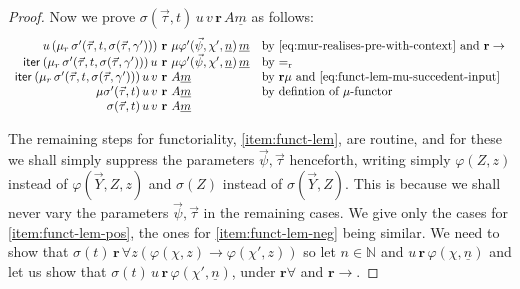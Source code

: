 \documentclass[10pt,a4paper]{amsart}
\theoremstyle{plain}
\theoremstyle{definition}
\renewcommand{\phi}{\varphi}
\theoremstyle{plain}
\theoremstyle{definition} %
\newcommand{\numeral}[1]{\underline{#1}}
\newcommand{\Nat}{\mathbb{N}}
\newcommand{\iter}[1]{\mathsf{iter}_{#1}}
\newcommand{\rr}[1]{#1_r}
\newcommand{\reduction}{\mathrm{r}}
\newcommand{\converts}{=_{\reduction}}
\newcommand{\limp}{\to}
\newcommand{\realises}{\mathbf{r}}
\begin{document}
\begin{proof}
    Now we prove $\sigma(\vec \tau,t)\, u\, v\, \realises\, A\numeral m$ as follows:
    \[
    \begin{array}{r@{\ \realises \ }ll}
          u\, (\rr\mu\, \sigma'(\vec \tau,t,\sigma(\vec \tau,\gamma'))) & \mu\phi'(\vec \psi,\chi',\numeral n)\, \numeral m & \text{by \eqref{eq:mur-realises-pre-with-context} and $\realises\limp$}\\
          \iter{}\, (\rr\mu\, \sigma'(\vec \tau,t,\sigma(\vec \tau,\gamma')))\, u & \mu\phi'(\vec \psi,\chi',\numeral n)\, \numeral m & \text{by $\converts$} \\
          \iter{}\, (\rr\mu\, \sigma'(\vec \tau,t,\sigma(\vec \tau,\gamma')))\, u\, v & A \numeral m & \text{by $\realises \mu$ and \eqref{eq:funct-lem-mu-succedent-input}} \\
          \mu \sigma'(\vec \tau,t) \, u \, v & A\numeral m & \text{by defintion of $\mu$-functor} \\
          \sigma(\vec \tau,t)\, u\, v & A\numeral m
    \end{array}
    \]


    The remaining steps for functoriality, \eqref{item:funct-lem}, are routine, and for these we shall simply suppress the parameters $\vec \psi,\vec \tau$ henceforth, writing simply $\phi(Z,z)$ instead of $\phi(\vec Y,Z,z)$ and $\sigma(Z)$ instead of $\sigma(\vec Y,Z)$.
    This is because we shall never vary the parameters $\vec \psi,\vec \tau$ in the remaining cases.
    We give only the cases for \cref{item:funct-lem-pos}, the ones for \cref{item:funct-lem-neg} being similar.
     We need to show that $\sigma(t) \, \realises\, \forall z (\phi(\chi,z) \limp \phi(\chi',z))$ so let $n\in \Nat$ and $u\, \realises\, \phi(\chi,\numeral n)$ and let us show that $\sigma(t)\, u\,  \realises\, \phi(\chi',\numeral n)$, under $\realises\forall$ and $\realises\limp$.


\end{proof}
\end{document}
